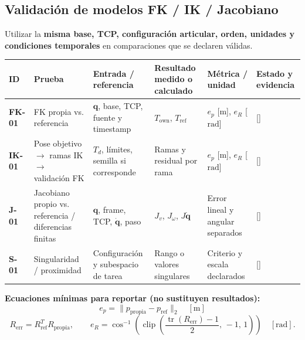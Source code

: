 \documentclass[10pt, a4paper]{article}
\newcommand{\campo}[1]{{\ttfamily\small[#1]}}
\begin{document}
\subsection{Validación de modelos FK / IK / Jacobiano}

Utilizar la \textbf{misma base, TCP, configuración articular, orden, unidades y condiciones temporales} en comparaciones que se declaren válidas.

\begingroup
\scriptsize
\setlength{\tabcolsep}{3.5pt}
\renewcommand{\arraystretch}{1.35}
\noindent\begin{tabularx}{\textwidth}{|l|>{\hsize=0.90\hsize\raggedright\arraybackslash}X|>{\hsize=1.05\hsize\raggedright\arraybackslash}X|>{\hsize=1.05\hsize\raggedright\arraybackslash}X|>{\hsize=1.00\hsize\raggedright\arraybackslash}X|>{\hsize=1.00\hsize\raggedright\arraybackslash}X|}
\hline
\rowcolor{ucbblue!15}
\textbf{ID} & \textbf{Prueba} & \textbf{Entrada / referencia} & \textbf{Resultado medido o calculado} & \textbf{Métrica / unidad} & \textbf{Estado y evidencia} \\ \hline
\textbf{FK-01} & FK propia vs. referencia & $\mathbf{q}$, base, TCP, fuente y timestamp & $T_{\mathrm{own}}$, $T_{\mathrm{ref}}$ & $e_p$ [$\mathrm{m}$], $e_R$ [$\mathrm{rad}$] & \campo{\quad} \\ \hline
\textbf{IK-01} & Pose objetivo $\to$ ramas IK $\to$ validación FK & $T_d$, límites, semilla si corresponde & Ramas y residual por rama & $e_p$ [$\mathrm{m}$], $e_R$ [$\mathrm{rad}$] & \campo{\quad} \\ \hline
\textbf{J-01} & Jacobiano propio vs. referencia / diferencias finitas & $\mathbf{q}$, frame, TCP, $\dot{\mathbf{q}}$, paso & $J_v$, $J_\omega$, $J\dot{\mathbf{q}}$ & Error lineal y angular separados & \campo{\quad} \\ \hline
\textbf{S-01} & Singularidad / proximidad & Configuración y subespacio de tarea & Rango o valores singulares & Criterio y escala declarados & \campo{\quad} \\ \hline
\end{tabularx}
\endgroup

\textbf{Ecuaciones mínimas para reportar (no sustituyen resultados):}
\begin{equation}
    e_p = \|p_{\mathrm{propia}} - p_{\mathrm{ref}}\|_2 \quad [\mathrm{m}]
    \label{eq:error_posicion}
\end{equation}
\begin{equation}
    R_{\mathrm{err}} = R_{\mathrm{ref}}^{T} R_{\mathrm{propia}}, \qquad
    e_R = \cos^{-1}\!\left(\operatorname{clip}\!\left(\frac{\operatorname{tr}(R_{\mathrm{err}}) - 1}{2},\, -1,\, 1\right)\right) \quad [\mathrm{rad}].
    \label{eq:error_orientacion}
\end{equation}
\end{document}
